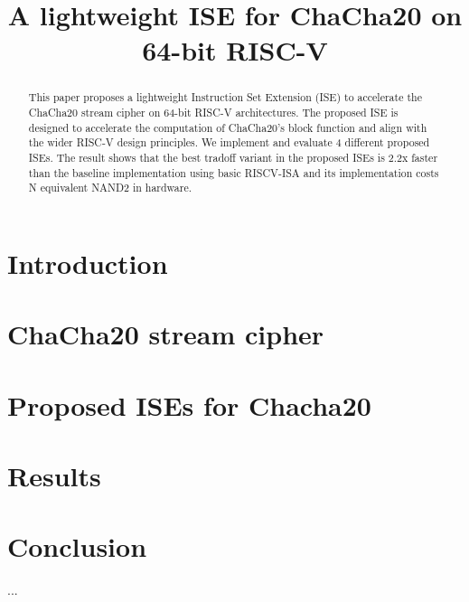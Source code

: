 \documentclass[submission]{iacrtrans}
\title{A lightweight ISE for ChaCha20 on 64-bit RISC-V}
\author{}
\begin{document}

\maketitle

\begin{abstract}
This paper proposes a lightweight Instruction Set Extension (ISE) to accelerate the ChaCha20 stream cipher on 64-bit RISC-V architectures. The proposed ISE is designed to accelerate the computation of ChaCha20's block function and align with the wider RISC-V design principles. We implement and evaluate 4 different proposed ISEs. The result shows that the best tradoff variant in the proposed ISEs is 2.2x faster than the baseline implementation using basic RISCV-ISA and its implementation costs N equivalent NAND2 in hardware.
\end{abstract}



\section{Introduction}
\label{sec:intro}


\section{ChaCha20 stream cipher}
\label{sec:bg}


\section{Proposed ISEs for Chacha20}
\label{sec:ise}


\section{Results}
\label{sec:res}


\section{Conclusion}
\label{sec:outro}
...





\end{document}
